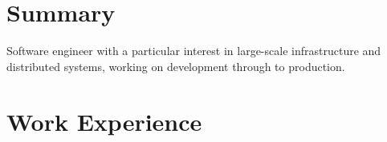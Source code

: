 \documentclass[overlapped,line]{resume}
\begin{document}
\begin{resume}
\section{\mysidestyle Summary}

Software engineer with a particular interest in large-scale infrastructure and
distributed systems, working on development through to production.

\section{\mysidestyle Work Experience}


\end{resume}
\end{document}
